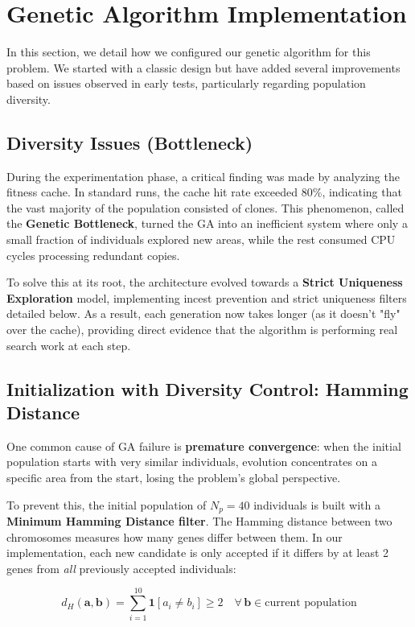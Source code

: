 \documentclass[12pt, a4paper]{article}
\begin{document}
\section{Genetic Algorithm Implementation}

In this section, we detail how we configured our genetic algorithm for this problem.
We started with a classic design but have added several improvements based on issues
observed in early tests, particularly regarding population diversity.

\subsection{Diversity Issues (Bottleneck)}

During the experimentation phase, a critical finding was made by analyzing the
fitness cache. In standard runs, the cache hit rate exceeded 80\%, indicating that
the vast majority of the population consisted of clones. This phenomenon, called the
\textbf{Genetic Bottleneck}, turned the GA into an inefficient system where only a
small fraction of individuals explored new areas, while the rest consumed CPU cycles
processing redundant copies.

To solve this at its root, the architecture evolved towards a \textbf{Strict Uniqueness
Exploration} model, implementing incest prevention and strict uniqueness filters detailed
below. As a result, each generation now takes longer (as it doesn't "fly" over the cache),
providing direct evidence that the algorithm is performing real search work at each step.

\subsection{Initialization with Diversity Control: Hamming Distance}

One common cause of GA failure is \textbf{premature convergence}: when the initial
population starts with very similar individuals, evolution concentrates on a specific
area from the start, losing the problem's global perspective.

To prevent this, the initial population of $N_p = 40$ individuals is built with a
\textbf{Minimum Hamming Distance filter}. The Hamming distance between two chromosomes
measures how many genes differ between them. In our implementation, each new candidate
is only accepted if it differs by at least 2 genes from \textit{all} previously accepted
individuals:

\begin{equation}
  d_H(\mathbf{a}, \mathbf{b}) = \sum_{i=1}^{10} \mathbf{1}[a_i \neq b_i] \geq 2
  \quad \forall \, \mathbf{b} \in \text{current population}
\end{equation}
\end{document}

